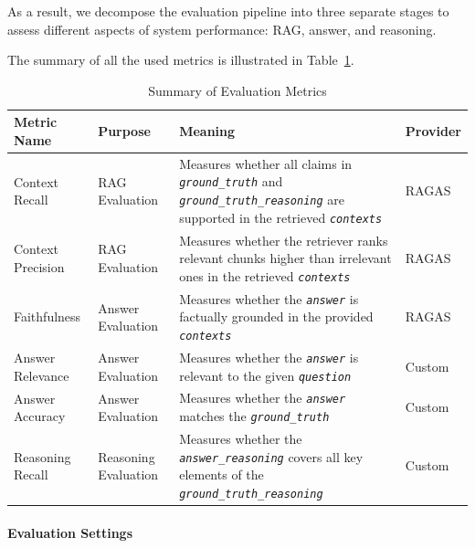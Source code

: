 As a result, we decompose the evaluation pipeline into three separate stages to assess different aspects of system performance: RAG, answer, and reasoning.

The summary of all the used metrics is illustrated in Table~\ref{tab:metric_summary}.

\newcommand{\var}[1]{\texttt{\textit{#1}}}

\begin{table}[t]
\centering
\caption{Summary of Evaluation Metrics}
\label{tab:metric_summary}
\renewcommand{\arraystretch}{1.2}
\setlength{\tabcolsep}{4pt}
\begin{tabular}{p{3cm}p{3cm}p{8cm}p{2cm}}
\hline
\textbf{Metric Name} &
\textbf{Purpose} &
\textbf{Meaning} &
\textbf{Provider} \\
\hline

Context Recall &
RAG Evaluation &
Measures whether all claims in \var{ground\_truth} and \var{ground\_truth\_reasoning} are supported in the retrieved \var{contexts} &
RAGAS \\

Context Precision &
RAG Evaluation &
Measures whether the retriever ranks relevant chunks higher than irrelevant ones in the retrieved \var{contexts} &
RAGAS \\

Faithfulness &
Answer Evaluation &
Measures whether the \var{answer} is factually grounded in the provided \var{contexts} &
RAGAS \\

Answer Relevance &
Answer Evaluation &
Measures whether the \var{answer} is relevant to the given \var{question} &
Custom \\

Answer Accuracy &
Answer Evaluation &
Measures whether the \var{answer} matches the \var{ground\_truth} &
Custom \\

Reasoning Recall &
Reasoning Evaluation &
Measures whether the \var{answer\_reasoning} covers all key elements of the \var{ground\_truth\_reasoning} &
Custom \\

\hline
\end{tabular}
\end{table}

\paragraph{Evaluation Settings}

